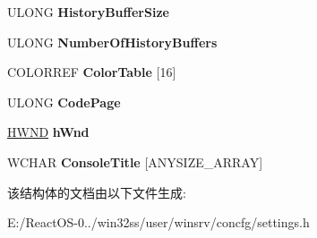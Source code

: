 \begin{DoxyCompactItemize}
U\+L\+O\+NG {\bfseries History\+Buffer\+Size}
\item 
\mbox{\label{struct___c_o_n_s_o_l_e___s_t_a_t_e___i_n_f_o_a08dd6fa38c23348402c90620faba861a}} 
U\+L\+O\+NG {\bfseries Number\+Of\+History\+Buffers}
\item 
\mbox{\label{struct___c_o_n_s_o_l_e___s_t_a_t_e___i_n_f_o_ac9ff253799a9ef1e07287871e14a23a9}} 
C\+O\+L\+O\+R\+R\+EF {\bfseries Color\+Table} \mbox{[}16\mbox{]}
\item 
\mbox{\label{struct___c_o_n_s_o_l_e___s_t_a_t_e___i_n_f_o_a3476874944164b793c86a04954f5a8c4}} 
U\+L\+O\+NG {\bfseries Code\+Page}
\item 
\mbox{\label{struct___c_o_n_s_o_l_e___s_t_a_t_e___i_n_f_o_a6abebe44c6251d2ab71e56ddbe52c1a9}} 
\hyperlink{interfacevoid}{H\+W\+ND} {\bfseries h\+Wnd}
\item 
\mbox{\label{struct___c_o_n_s_o_l_e___s_t_a_t_e___i_n_f_o_a622d3f6483db63372835ca9b024818a7}} 
W\+C\+H\+AR {\bfseries Console\+Title} \mbox{[}A\+N\+Y\+S\+I\+Z\+E\+\_\+\+A\+R\+R\+AY\mbox{]}
\end{DoxyCompactItemize}


该结构体的文档由以下文件生成\+:\begin{DoxyCompactItemize}
\item 
E\+:/\+React\+O\+S-\/0../win32ss/user/winsrv/concfg/settings.\+h\end{DoxyCompactItemize}
